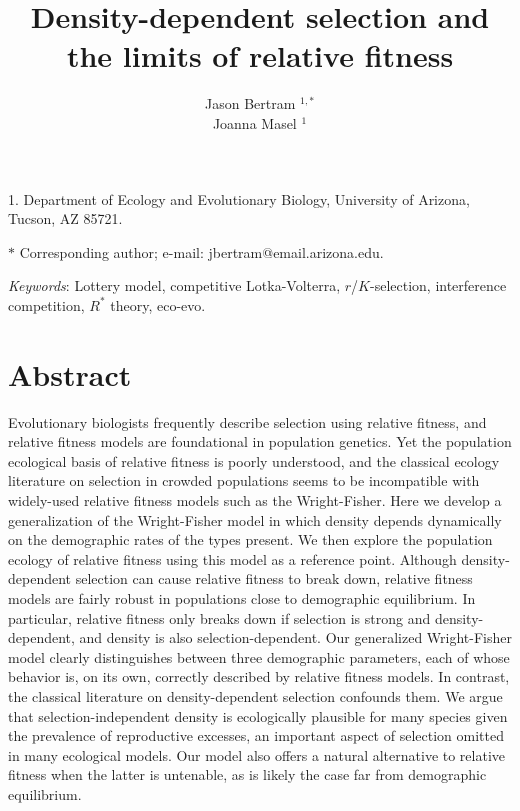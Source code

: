 \documentclass[11pt]{article}
\title{Density-dependent selection and the limits of relative fitness}
\author{Jason Bertram $^{1,\ast}$ \\ 
Joanna Masel $^{1}$}
\date{}
\begin{document}
\maketitle

\noindent{}1. Department of Ecology and Evolutionary Biology, University of Arizona, Tucson, AZ 85721.

\noindent{}$\ast$ Corresponding author; e-mail: jbertram@email.arizona.edu.


\bigskip


\bigskip

\textit{Keywords}: Lottery model, competitive Lotka-Volterra, $r$/$K$-selection, interference competition, $R^*$ theory, eco-evo.

\bigskip


\linenumbers{}
\modulolinenumbers[1]

\newpage{}

\section*{Abstract}

Evolutionary biologists frequently describe selection using relative fitness, and relative fitness models are foundational in population genetics. Yet the population ecological basis of relative fitness is poorly understood, and the classical ecology literature on selection in crowded populations seems to be incompatible with widely-used relative fitness models such as the Wright-Fisher. Here we develop a generalization of the Wright-Fisher model in which density depends dynamically on the demographic rates of the types present. We then explore the population ecology of relative fitness using this model as a reference point. Although density-dependent selection can cause relative fitness to break down, relative fitness models are fairly robust in populations close to demographic equilibrium. In particular, relative fitness only breaks down if selection is strong and density-dependent, and density is also selection-dependent. Our generalized Wright-Fisher model clearly distinguishes between three demographic parameters, each of whose behavior is, on its own, correctly described by relative fitness models. In contrast, the classical literature on density-dependent selection confounds them. We argue that selection-independent density is ecologically plausible for many species given the prevalence of reproductive excesses, an important aspect of selection omitted in many ecological models. Our model also offers a natural alternative to relative fitness when the latter is untenable, as is likely the case far from demographic equilibrium. 
\end{document}
